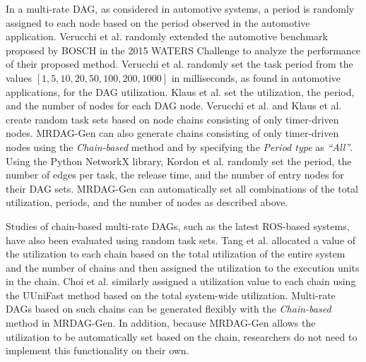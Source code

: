 In a multi-rate DAG, as considered in automotive systems, a period is randomly assigned to each node based on the period observed in the automotive application.
Verucchi et al. \cite{verucchi2020latency} randomly extended the automotive benchmark proposed by BOSCH in the 2015 WATERS Challenge \cite{kramer2015real} to analyze the performance of their proposed method.
Verucchi et al. randomly set the task period from the values $[1, 5, 10, 20, 50, 100, 200, 1000]$ in milliseconds, as found in automotive applications, for the DAG utilization.
Klaus et al. \cite{klaus2021constrained} set the utilization, the period, and the number of nodes for each DAG node.
Verucchi et al. and Klaus et al. create random task sets based on node chains consisting of only timer-driven nodes.
MRDAG-Gen can also generate chains consisting of only timer-driven nodes using the {\it Chain-based} method and by specifying the {\it Period type} as {\it “All”}.
Using the Python NetworkX library, Kordon et al. \cite{kordon2020evaluation} randomly set the period, the number of edges per task, the release time, and the number of entry nodes for their DAG sets.
MRDAG-Gen can automatically set all combinations of the total utilization, periods, and the number of nodes as described above.

Studies of chain-based multi-rate DAGs, such as the latest ROS-based systems, have also been evaluated using random task sets.
Tang et al. \cite{tang2020response} allocated a value of the utilization to each chain based on the total utilization of the entire system and the number of chains and then assigned the utilization to the execution units in the chain.
Choi et al. \cite{choi2021picas} similarly assigned a utilization value to each chain using the UUniFast method based on the total system-wide utilization.
Multi-rate DAGs based on such chains can be generated flexibly with the {\it Chain-based} method in MRDAG-Gen.
In addition, because MRDAG-Gen allows the utilization to be automatically set based on the chain, researchers do not need to implement this functionality on their own.
